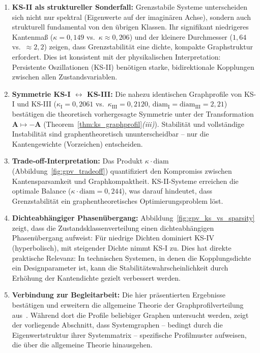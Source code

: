 ﻿\documentclass[12pt, a4paper, titlepage]{report}
\theoremstyle{definition}
\theoremstyle{remark}
\newcommand{\vA}{\bm{A}}
\begin{document}
\begin{enumerate}[label=(\arabic*)]
  \item \textbf{KS-II als struktureller Sonderfall:} Grenzstabile Systeme unterscheiden
    sich nicht nur spektral (Eigenwerte auf der imaginären Achse), sondern auch strukturell
    fundamental von den übrigen Klassen. Ihr signifikant niedrigeres Kantenmaß
    ($\kappa = 0{,}149$ vs.\ $\kappa \approx 0{,}206$) und der kleinere Durchmesser
    ($1{,}64$ vs.\ $\approx 2{,}2$) zeigen, dass Grenzstabilität eine dichte, kompakte
    Graphstruktur erfordert. Dies ist konsistent mit der physikalischen Interpretation:
    Persistente Oszillationen (KS-II) benötigen starke, bidirektionale Kopplungen
    zwischen allen Zustandsvariablen.

  \item \textbf{Symmetrie KS-I $\leftrightarrow$ KS-III:} Die nahezu identischen
    Graphprofile von KS-I und KS-III ($\kappa_{\mathrm{I}} = 0{,}2061$ vs.\
    $\kappa_{\mathrm{III}} = 0{,}2120$, $\mathrm{diam}_{\mathrm{I}} =
    \mathrm{diam}_{\mathrm{III}} = 2{,}21$) bestätigen die theoretisch vorhergesagte
    Symmetrie unter der Transformation $\vA \mapsto -\vA$
    (Theorem~\ref{thm:ks_graphprofil}\textit{(iii)}). Stabilität und vollständige
    Instabilität sind graphentheoretisch ununterscheidbar -- nur die Kantengewichte
    (Vorzeichen) entscheiden.

  \item \textbf{Trade-off-Interpretation:} Das Produkt $\kappa \cdot \mathrm{diam}$
    (Abbildung~\ref{fig:gpv_tradeoff}) quantifiziert den Kompromiss zwischen
    Kantensparsamkeit und Graphkompaktheit. KS-II-Systeme erreichen die optimale
    Balance ($\kappa \cdot \mathrm{diam} = 0{,}244$), was darauf hindeutet, dass
    Grenzstabilität ein graphentheoretisches Optimierungsproblem löst.

  \item \textbf{Dichteabhängiger Phasenübergang:} Abbildung~\ref{fig:gpv_ks_vs_sparsity}
    zeigt, dass die Zustandsklassenverteilung einen dichteabhängigen Phasenübergang
    aufweist: Für niedrige Dichten dominiert KS-IV (hyperbolisch), mit steigender
    Dichte nimmt KS-I zu. Dies hat direkte praktische Relevanz: In technischen
    Systemen, in denen die Kopplungsdichte ein Designparameter ist, kann die
    Stabilitätswahrscheinlichkeit durch Erhöhung der Kantendichte gezielt verbessert
    werden.

  \item \textbf{Verbindung zur Begleitarbeit:} Die hier präsentierten Ergebnisse
    bestätigen und erweitern die allgemeine Theorie der Graphprofilverteilung
    aus~\citep{epp2026graphs}. Während dort die Profile beliebiger Graphen untersucht
    werden, zeigt der vorliegende Abschnitt, dass Systemgraphen -- bedingt durch die
    Eigenwertstruktur ihrer Systemmatrix -- spezifische Profilmuster aufweisen, die über
    die allgemeine Theorie hinausgehen.
\end{enumerate}
\end{document}
